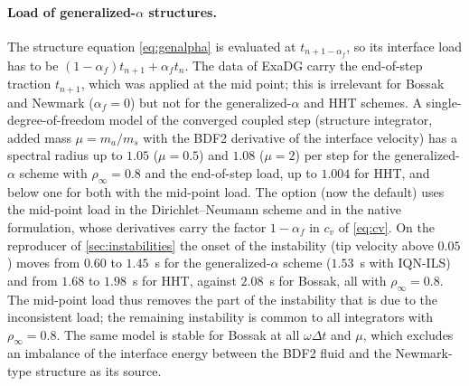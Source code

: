 \documentclass[11pt,a4paper]{article}
\theoremstyle{definition}
\theoremstyle{remark}
\begin{document}
\paragraph{Load of generalized-$\alpha$ structures.} The structure equation \eqref{eq:genalpha} is
evaluated at $t_{n+1-\alpha_f}$, so its interface load has to be
$(1-\alpha_f)t_{n+1}+\alpha_ft_n$. The  data of ExaDG carry the end-of-step
traction $t_{n+1}$, which was applied at the mid point; this is irrelevant for Bossak and Newmark
($\alpha_f=0$) but not for the generalized-$\alpha$ and HHT schemes. A single-degree-of-freedom
model of the converged coupled step (structure integrator, added mass $\mu=m_a/m_s$ with the BDF2
derivative of the interface velocity) has a spectral radius up to $1.05$ ($\mu=0.5$) and $1.08$
($\mu=2$) per step for the generalized-$\alpha$ scheme with $\rho_\infty=0.8$ and the end-of-step
load, up to $1.004$ for HHT, and below one for both with the mid-point load. The option
 (now the default) uses the mid-point load in the
Dirichlet--Neumann scheme and in the native formulation, whose derivatives carry the factor
$1-\alpha_f$ in $c_v$ of \eqref{eq:cv}. On the reproducer of \cref{sec:instabilities} the onset of
the instability (tip velocity above $0.05$) moves from $0.60$ to $1.45$~s for the
generalized-$\alpha$ scheme ($1.53$~s with IQN-ILS) and from $1.68$ to $1.98$~s for HHT, against
$2.08$~s for Bossak, all with $\rho_\infty=0.8$. The mid-point load thus removes the part of the
instability that is due to the inconsistent load; the remaining instability is common to all
integrators with $\rho_\infty=0.8$. The same model is stable for Bossak at all $\omega\Delta t$ and
$\mu$, which excludes an imbalance of the interface energy between the BDF2 fluid and the
Newmark-type structure as its source.
\end{document}
